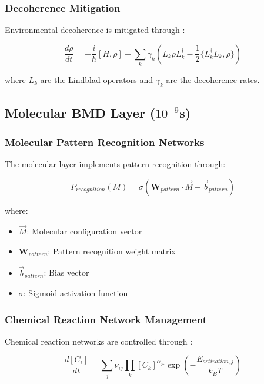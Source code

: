 \documentclass[12pt,a4paper]{article}
\begin{document}
\subsubsection{Decoherence Mitigation}

Environmental decoherence is mitigated through \cite{breuer2002theory}:

\begin{equation}
\frac{d\rho}{dt} = -\frac{i}{\hbar}[H, \rho] + \sum_k \gamma_k \left( L_k \rho L_k^\dagger - \frac{1}{2}\{L_k^\dagger L_k, \rho\} \right)
\end{equation}

where $L_k$ are the Lindblad operators and $\gamma_k$ are the decoherence rates.

\subsection{Molecular BMD Layer ($10^{-9}$s)}

\subsubsection{Molecular Pattern Recognition Networks}

The molecular layer implements pattern recognition through:

\begin{equation}
P_{recognition}(M) = \sigma\left(\mathbf{W}_{pattern} \cdot \vec{M} + \vec{b}_{pattern}\right)
\end{equation}

where:
\begin{itemize}
\item $\vec{M}$: Molecular configuration vector
\item $\mathbf{W}_{pattern}$: Pattern recognition weight matrix
\item $\vec{b}_{pattern}$: Bias vector
\item $\sigma$: Sigmoid activation function
\end{itemize}

\subsubsection{Chemical Reaction Network Management}

Chemical reaction networks are controlled through \cite{erdi2005mathematical}:

\begin{equation}
\frac{d[C_i]}{dt} = \sum_j \nu_{ij} \prod_k [C_k]^{\alpha_{jk}} \exp\left(-\frac{E_{activation,j}}{k_B T}\right)
\end{equation}
\end{document}
